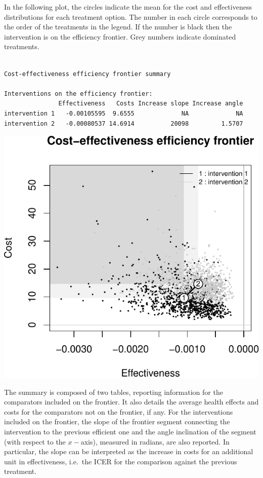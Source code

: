 \documentclass[]{article}
\begin{document}
In the following plot, the circles indicate the mean for the cost and
effectiveness distributions for each treatment option. The number in
each circle corresponds to the order of the treatments in the legend. If
the number is black then the intervention is on the efficiency frontier.
Grey numbers indicate dominated treatments.

\begin{verbatim}

Cost-effectiveness efficiency frontier summary 

Interventions on the efficiency frontier:
               Effectiveness   Costs Increase slope Increase angle
intervention 1   -0.00105595  9.6555             NA             NA
intervention 2   -0.00080537 14.6914          20098         1.5707
\end{verbatim}

\begin{center}\includegraphics{report_files/figure-latex/unnamed-chunk-7-1} \end{center}

The summary is composed of two tables, reporting information for the
comparators included on the frontier. It also details the average health
effects and costs for the comparators not on the frontier, if any. For
the interventions included on the frontier, the slope of the frontier
segment connecting the intervention to the previous efficient one and
the angle inclination of the segment (with respect to the \(x-\)axis),
measured in radians, are also reported. In particular, the slope can be
interpreted as the increase in costs for an additional unit in
effectiveness, i.e.~the ICER for the comparison against the previous
treatment.
\end{document}

